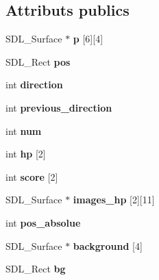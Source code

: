 \subsection*{Attributs publics}
\begin{DoxyCompactItemize}
\item 
\mbox{\label{structperso_a12fc662a43d623979458104aa64051d7}} 
S\+D\+L\+\_\+\+Surface $\ast$ {\bfseries p} \mbox{[}6\mbox{]}\mbox{[}4\mbox{]}
\item 
\mbox{\label{structperso_a1702962d93240085dc2dfab4c0d7754f}} 
S\+D\+L\+\_\+\+Rect {\bfseries pos}
\item 
\mbox{\label{structperso_a76b41475467835b866812bdbaafb6909}} 
int {\bfseries direction}
\item 
\mbox{\label{structperso_a9a114ad315d65e3c2e17b407eb080b91}} 
int {\bfseries previous\+\_\+direction}
\item 
\mbox{\label{structperso_a7f75eb44b8c8bb04d499547fe9f0873c}} 
int {\bfseries num}
\item 
\mbox{\label{structperso_a7276d0267b905e084a91f2c156fb46eb}} 
int {\bfseries hp} \mbox{[}2\mbox{]}
\item 
\mbox{\label{structperso_a00a7c864ddb8aed3d8a01e29c4ae0d7b}} 
int {\bfseries score} \mbox{[}2\mbox{]}
\item 
\mbox{\label{structperso_a16124d4b769b42483530bdcddfabb93a}} 
S\+D\+L\+\_\+\+Surface $\ast$ {\bfseries images\+\_\+hp} \mbox{[}2\mbox{]}\mbox{[}11\mbox{]}
\item 
\mbox{\label{structperso_afc6ab25d4a7c812315486a94566a9fdb}} 
int {\bfseries pos\+\_\+absolue}
\item 
\mbox{\label{structperso_a136cb618fb6a48f3d386bf358a575b74}} 
S\+D\+L\+\_\+\+Surface $\ast$ {\bfseries background} \mbox{[}4\mbox{]}
\item 
\mbox{\label{structperso_a30e99273ad4d5f5a50c72f1626cc405b}} 
S\+D\+L\+\_\+\+Rect {\bfseries bg}

\end{DoxyCompactItemize}
